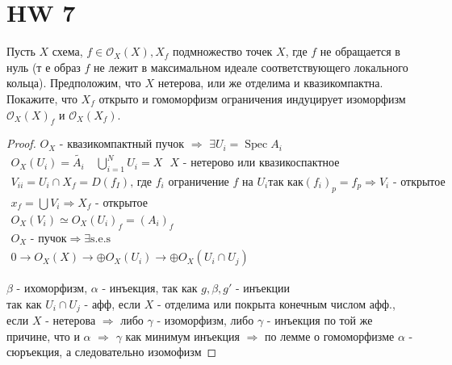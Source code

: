 \section{HW 7}

\begin{prob}
Пусть $X$ схема, $f \in \mathcal{O}_X(X), X_f$ подмножество точек $X$, где $f$ не обращается в нуль (т е образ $f$ не лежит в максимальном идеале соответствующего локального кольца). Предположим, что $X$ нетерова, или же отделима и квазикомпактна. Покажите, что $X_f$ открыто и гомоморфизм ограничения индуцирует изоморфизм $\mathcal{O}_X(X)_f$ и $\mathcal{O}_X\left(X_f\right)$.
\end{prob}
\begin{proof}
$O_X$ - квазикомпактный пучок $\Rightarrow$ $\exists U_i = \operatorname{Spec} A_i$
\begin{gather*}
    O_X(U_i) = \tilde{A_i}\quad
    \bigcup_{i = 1}^{N} U_i = X \text{ $X$ - нетерово или квазикоспактное}\\
    V_{ii} = U_i \cap X_f = D(f_I) \text{, где $f_i$ ограничение $f$ на $U_i$}
    \text{так как} (f_i)_p = f_p \Rightarrow V_i \text{ - открытое}\\
    x_f = \bigcup V_i \Rightarrow X_f \text{ - открытое}\\
    O_X(V_i) \simeq O_X(U_i)_f = (A_i)_f\\
    O_X \text{ - пучок} \Rightarrow \exists \text{s.e.s}\\
    0 \to O_X(X) \to \oplus O_X(U_i) \to \oplus O_X(U_i \cap U_j)
\end{gather*}
$\beta$ - ихоморфизм, $\alpha$ - инъекция, так как $g, \beta, g'$ - инъекции\\
\noindent
так как $U_i \cap U_j$ - афф, если $X$ - отделима или покрыта конечным числом афф., если $X$ - нетерова $\Rightarrow$ либо $\gamma$ - изоморфизм, либо $\gamma$ - инъекция по той же причине, что и $\alpha$ $\Rightarrow$ $\gamma$ как минимум инъекция $\Rightarrow$ по лемме о гомоморфизме $\alpha$ - сюръекция, а следовательно изомофизм
\end{proof}
\vskip 0.6in





